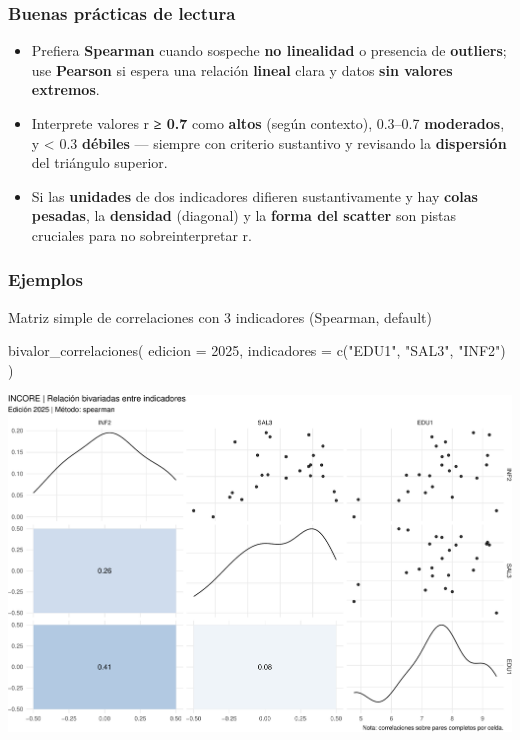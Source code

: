 \documentclass[
  11pt,
  letterpaper,
  DIV=11,
  numbers=noendperiod]{scrartcl}
\newenvironment{Shaded}{\begin{snugshade}}{\end{snugshade}}
\newcommand{\AttributeTok}[1]{\textcolor[rgb]{0.40,0.45,0.13}{#1}}
\newcommand{\DecValTok}[1]{\textcolor[rgb]{0.68,0.00,0.00}{#1}}
\newcommand{\FunctionTok}[1]{\textcolor[rgb]{0.28,0.35,0.67}{#1}}
\newcommand{\NormalTok}[1]{\textcolor[rgb]{0.00,0.23,0.31}{#1}}
\newcommand{\StringTok}[1]{\textcolor[rgb]{0.13,0.47,0.30}{#1}}
\begin{document}
\subsubsection{\texorpdfstring{\textbf{Buenas prácticas de
lectura}}{Buenas prácticas de lectura}}\label{buenas-pruxe1cticas-de-lectura}

\begin{itemize}
\item
  Prefiera \textbf{Spearman} cuando sospeche \textbf{no linealidad} o
  presencia de \textbf{outliers}; use \textbf{Pearson} si espera una
  relación \textbf{lineal} clara y datos \textbf{sin valores extremos}.
\item
  Interprete valores \textbar r\textbar{} \textbf{≥ 0.7} como
  \textbf{altos} (según contexto), 0.3--0.7 \textbf{moderados}, y
  \textless{} 0.3 \textbf{débiles} --- siempre con criterio sustantivo y
  revisando la \textbf{dispersión} del triángulo superior.
\item
  Si las \textbf{unidades} de dos indicadores difieren sustantivamente y
  hay \textbf{colas pesadas}, la \textbf{densidad} (diagonal) y la
  \textbf{forma del scatter} son pistas cruciales para no
  sobreinterpretar r.
\end{itemize}

\subsubsection{\texorpdfstring{\textbf{Ejemplos}}{Ejemplos}}\label{ejemplos-22}

Matriz simple de correlaciones con 3 indicadores (Spearman, default)

\begin{Shaded}
\begin{Highlighting}[]
\FunctionTok{bivalor\_correlaciones}\NormalTok{(}
  \AttributeTok{edicion =} \DecValTok{2025}\NormalTok{,}
  \AttributeTok{indicadores =} \FunctionTok{c}\NormalTok{(}\StringTok{"EDU1"}\NormalTok{, }\StringTok{"SAL3"}\NormalTok{, }\StringTok{"INF2"}\NormalTok{)}
\NormalTok{)}
\end{Highlighting}
\end{Shaded}

\includegraphics{Manual_files/figure-pdf/unnamed-chunk-113-1.pdf}
\end{document}

